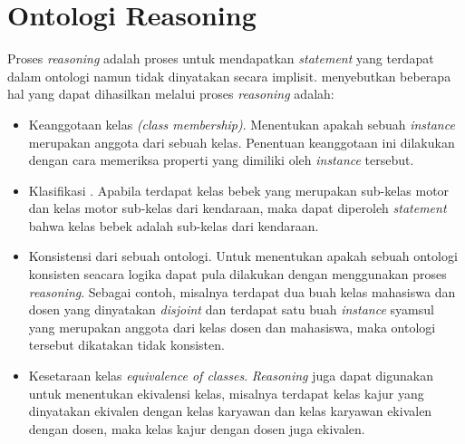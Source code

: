 \section{Ontologi Reasoning}
Proses \emph{reasoning} adalah proses untuk mendapatkan \emph{statement} yang terdapat dalam ontologi namun tidak dinyatakan secara implisit. \citet*{antoniou} menyebutkan beberapa hal yang dapat dihasilkan melalui proses \emph{reasoning} adalah:
\begin{itemize}
	\item Keanggotaan kelas \emph{(class membership)}. Menentukan apakah sebuah \emph{instance} merupakan anggota dari sebuah kelas. Penentuan keanggotaan ini dilakukan dengan cara memeriksa properti yang dimiliki oleh \emph{instance} tersebut.
	\item Klasifikasi . Apabila terdapat kelas bebek yang merupakan sub-kelas motor dan kelas motor sub-kelas dari kendaraan, maka dapat diperoleh \emph{statement} bahwa kelas bebek adalah sub-kelas dari kendaraan.
	\item Konsistensi dari sebuah ontologi. Untuk menentukan apakah sebuah ontologi konsisten seacara logika dapat pula dilakukan dengan menggunakan proses \emph{reasoning}. Sebagai contoh, misalnya terdapat dua buah kelas mahasiswa dan dosen yang dinyatakan \emph{disjoint} dan terdapat satu buah \emph{instance} syamsul yang merupakan anggota dari kelas dosen dan mahasiswa, maka ontologi tersebut dikatakan tidak konsisten.
	\item Kesetaraan kelas \emph{equivalence of classes}. \emph{Reasoning} juga dapat digunakan untuk menentukan ekivalensi kelas, misalnya terdapat kelas kajur yang dinyatakan ekivalen dengan kelas karyawan dan kelas karyawan ekivalen dengan dosen, maka kelas kajur dengan dosen juga ekivalen. 
\end{itemize}